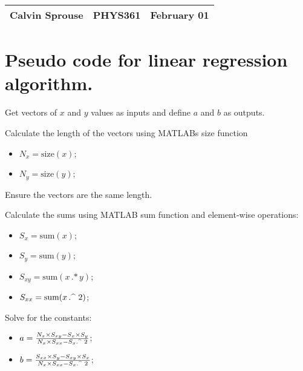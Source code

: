 \documentclass[a4paper, 12pt]{config/homework}
\begin{document}
\noindent
\begin{tabularx}{\textwidth}{>{\centering\arraybackslash}X>{\centering\arraybackslash}X>{\centering\arraybackslash}X}
Calvin Sprouse & PHYS361 & 2024 February 01\\
\midrule
\end{tabularx}

\section*{Pseudo code for linear regression algorithm.}
Get vectors of \(x\) and \(y\) values as inputs and define \(a\) and \(b\) as outputs.

\noindent
Calculate the length of the vectors using MATLABs size function
\begin{itemize}
\item \(N_x = \text{size}(x)\);
\item \(N_y = \text{size}(y)\);
\end{itemize}

\noindent
Ensure the vectors are the same length.

\noindent
Calculate the sums using MATLAB sum function and element-wise operations:
\begin{itemize}
\item \(S_x = \text{sum}(x)\);
\item \(S_y = \text{sum}(y)\);
\item \(S_{xy} = \text{sum}(x\, \text{.*}\, y)\);
\item \(S_{xx} = \text{sum}(x\, \text{.\string^}\ 2)\);
\end{itemize}

Solve for the constants:
\begin{itemize}
\item \(a = \frac{N_x \times S_{xy} - S_x\times S_y}{N_x \times S_{xx} - S_x \text{.\string^}\ 2}\);
\item \(b = \frac{S_{xx}\times S_y - S_{xy}\times S_x}{N_x \times S_{xx} - S_x\text{.\string^}\ 2}\);
\end{itemize}

%
%
\end{document}
